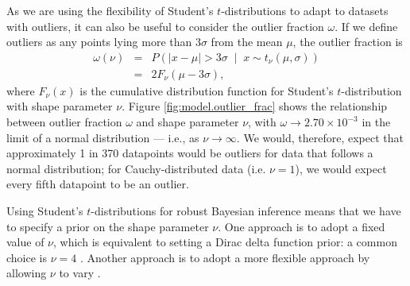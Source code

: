 \documentclass[fleqn,usenatbib]{mnras}
\newcommand{\studentt}[2]{t_\nu \left( #1, #2 \right)}
\begin{document}

As we are using the flexibility of Student's $t$-distributions to adapt to
datasets with outliers, it can also be useful to consider the outlier fraction
$\omega$. If we define outliers as any points lying more than $3\sigma$ from the
mean $\mu$, the outlier fraction is
\begin{eqnarray}
    \omega(\nu)
    &=& P\left(
        \left|x - \mu \right| > 3 \sigma \;
        \middle| \;
        x \sim \studentt{\mu}{\sigma}
    \right) \\
    &=& 2 F_\nu \left(\mu - 3 \sigma \right),
\end{eqnarray}
where $F_\nu(x)$ is the cumulative distribution function for Student's
$t$-distribution with shape parameter $\nu$. Figure \ref{fig:model.outlier_frac}
shows the relationship between outlier fraction $\omega$ and shape parameter
$\nu$, with $\omega \rightarrow 2.70 \times 10^{-3} $ in the limit of a normal
distribution --- i.e., as $\nu \rightarrow \infty$. We would, therefore, expect
that approximately 1 in 370 datapoints would be outliers for data that follows a
normal distribution; for Cauchy-distributed data (i.e. $\nu = 1$),
we would expect every fifth datapoint to be an outlier.


Using Student's $t$-distributions for robust Bayesian inference means that we
have to specify a prior on the shape parameter $\nu$. One approach is to adopt a
fixed value of $\nu$, which is equivalent to setting a Dirac delta function
prior: a common choice is $\nu = 4$ \citep[e.g.][]{Berger:1994, Gelman:2013}.
Another approach is to adopt a more flexible approach by allowing $\nu$ to vary
\citep[e.g.][]{Juarez:2010, Park:2017, Feeney:2018}.
\end{document}
